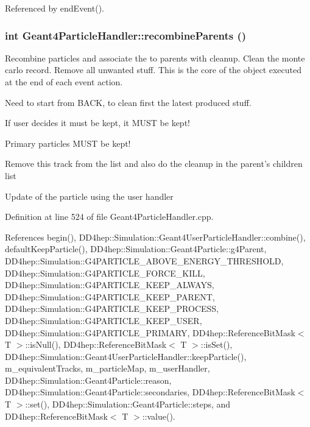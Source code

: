 Referenced by endEvent().\hypertarget{class_d_d4hep_1_1_simulation_1_1_geant4_particle_handler_a828738c3b9ec35cff6ea6fc659b6df4a}{
\subsubsection[{recombineParents}]{\setlength{\rightskip}{0pt plus 5cm}int Geant4ParticleHandler::recombineParents ()}}
\label{class_d_d4hep_1_1_simulation_1_1_geant4_particle_handler_a828738c3b9ec35cff6ea6fc659b6df4a}


Recombine particles and associate the to parents with cleanup. Clean the monte carlo record. Remove all unwanted stuff. This is the core of the object executed at the end of each event action. 

Need to start from BACK, to clean first the latest produced stuff.

If user decides it must be kept, it MUST be kept!

Primary particles MUST be kept!

Remove this track from the list and also do the cleanup in the parent's children list

Update of the particle using the user handler 

Definition at line 524 of file Geant4ParticleHandler.cpp.

References begin(), DD4hep::Simulation::Geant4UserParticleHandler::combine(), defaultKeepParticle(), DD4hep::Simulation::Geant4Particle::g4Parent, DD4hep::Simulation::G4PARTICLE\_\-ABOVE\_\-ENERGY\_\-THRESHOLD, DD4hep::Simulation::G4PARTICLE\_\-FORCE\_\-KILL, DD4hep::Simulation::G4PARTICLE\_\-KEEP\_\-ALWAYS, DD4hep::Simulation::G4PARTICLE\_\-KEEP\_\-PARENT, DD4hep::Simulation::G4PARTICLE\_\-KEEP\_\-PROCESS, DD4hep::Simulation::G4PARTICLE\_\-KEEP\_\-USER, DD4hep::Simulation::G4PARTICLE\_\-PRIMARY, DD4hep::ReferenceBitMask$<$ T $>$::isNull(), DD4hep::ReferenceBitMask$<$ T $>$::isSet(), DD4hep::Simulation::Geant4UserParticleHandler::keepParticle(), m\_\-equivalentTracks, m\_\-particleMap, m\_\-userHandler, DD4hep::Simulation::Geant4Particle::reason, DD4hep::Simulation::Geant4Particle::secondaries, DD4hep::ReferenceBitMask$<$ T $>$::set(), DD4hep::Simulation::Geant4Particle::steps, and DD4hep::ReferenceBitMask$<$ T $>$::value().

